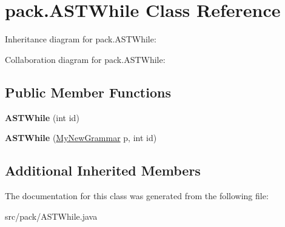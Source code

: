 \hypertarget{classpack_1_1_a_s_t_while}{}\section{pack.\+A\+S\+T\+While Class Reference}
\label{classpack_1_1_a_s_t_while}


Inheritance diagram for pack.\+A\+S\+T\+While\+:


Collaboration diagram for pack.\+A\+S\+T\+While\+:
\subsection*{Public Member Functions}
\begin{DoxyCompactItemize}
\item 
{\bfseries A\+S\+T\+While} (int id)\hypertarget{classpack_1_1_a_s_t_while_adf638dcffbb9f8dc98b923a249ce9d50}{}\label{classpack_1_1_a_s_t_while_adf638dcffbb9f8dc98b923a249ce9d50}

\item 
{\bfseries A\+S\+T\+While} (\hyperlink{classpack_1_1_my_new_grammar}{My\+New\+Grammar} p, int id)\hypertarget{classpack_1_1_a_s_t_while_aa1d8c5245238e99fb2597ce32d853465}{}\label{classpack_1_1_a_s_t_while_aa1d8c5245238e99fb2597ce32d853465}

\end{DoxyCompactItemize}
\subsection*{Additional Inherited Members}


The documentation for this class was generated from the following file\+:\begin{DoxyCompactItemize}
\item 
src/pack/A\+S\+T\+While.\+java\end{DoxyCompactItemize}

